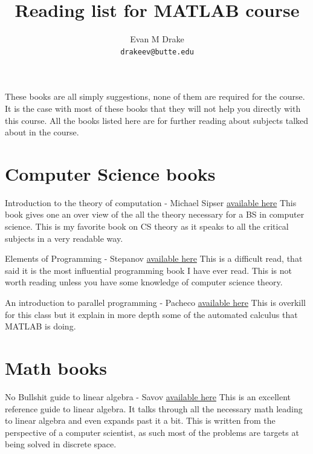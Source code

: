 \documentclass[12pt]{article}
\title{Reading list for MATLAB course}
\author{
	Evan M Drake \\
	\texttt{drakeev@butte.edu}
}
\begin{document}
	\maketitle


	These books are all simply suggestions,
		none of them are required for the course.
	It is the case with most of these books that they will not help you directly with this course.
	All the books listed here are for further reading about subjects talked about in the course.

	\section*{Computer Science books}
		\indent\indent Introduction to the theory of computation - Michael Sipser
		\href{https://www.amazon.com/Introduction-Theory-Computation-Michael-Sipser-dp-113318779X/dp/113318779X}{available here}
		This book gives one an over view of the all the theory necessary for a BS in computer science.
		This is my favorite book on CS theory as it speaks to all the critical subjects in a very readable way.

		Elements of Programming - Stepanov
		\href{https://www.amazon.com/Elements-Programming-Alexander-Stepanov/dp/0578222140?sr=1-1}{available here}
		This is a difficult read,
			that said it is the most influential programming book I have ever read.
		This is not worth reading unless you have some knowledge of computer science theory.

		An introduction to parallel programming - Pacheco
		\href{https://www.amazon.com/Introduction-Parallel-Programming-Peter-Pacheco/dp/0128046058?sr=8-1}{available here}
		This is overkill for this class but it explain in more depth some of the automated calculus that MATLAB is doing.

	\section*{Math books}

		\indent\indent No Bullshit guide to linear algebra - Savov
		\href{https://www.amazon.com/No-bullshit-guide-linear-algebra/dp/0992001021?sr=1-1}{available here}
		This is an excellent reference guide to linear algebra.
		It talks through all the necessary math leading to linear algebra and even expands past it a bit.
		This is written from the perspective of a computer scientist,
			as such most of the problems are targets at being solved in discrete space.
\end{document}
